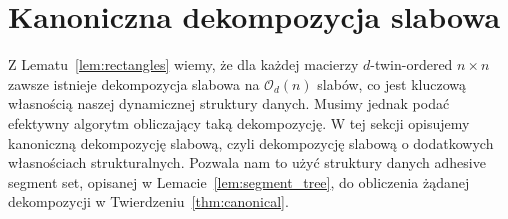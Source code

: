 \documentclass[runningheads]{llncs}
\newcommand{\wn}[2][inline]{\todo[color=green!50,#1]{{\textbf{W:} #2}}}
\newcommand{\jc}[2][inline]{\todo[color=brown!50,#1]{{\textbf{J:} #2}}}
\newcommand{\Oh}{\mathcal{O}}
\begin{document}

 
\section{Kanoniczna dekompozycja slabowa}
\label{sec:decomposition}


Z Lematu~\ref{lem:rectangles} wiemy, że dla każdej macierzy $d$-twin-ordered $n \times n$ zawsze istnieje dekompozycja slabowa na $\Oh_d(n)$ slabów, co jest kluczową własnością naszej dynamicznej struktury danych. Musimy jednak podać efektywny algorytm obliczający taką dekompozycję. 
W tej sekcji opisujemy kanoniczną dekompozycję slabową, czyli dekompozycję slabową o dodatkowych własnościach strukturalnych. Pozwala nam to użyć struktury danych adhesive segment set, opisanej w Lemacie~\ref{lem:segment_tree}, do obliczenia żądanej dekompozycji w Twierdzeniu~\ref{thm:canonical}.
\end{document}
